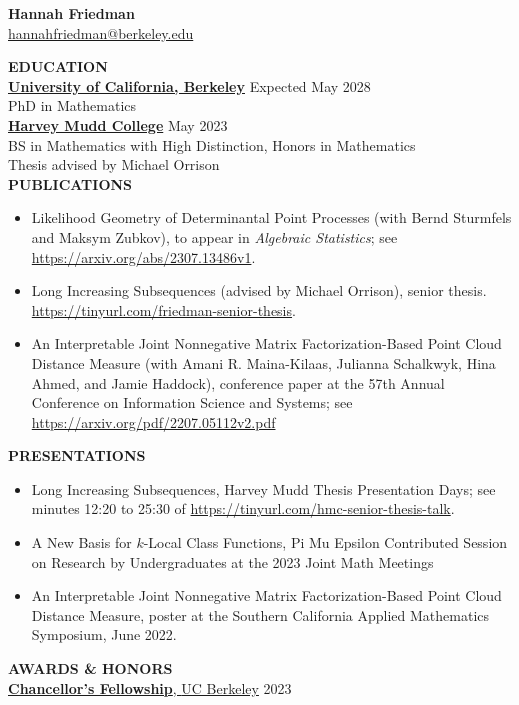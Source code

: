 \documentclass[11pt]{article}
\newcommand{\hdr}[1]{\textcolor{blue(ryb)}{\textbf{#1}}}
\newcommand{\role}[3]{\underline{\textbf{#1}, {#2}} \hfill #3}
\begin{document}
\begin{center}
\hdr{\Large{Hannah Friedman}}\\
\url{hannahfriedman@berkeley.edu}\\
\end{center}
\medskip
\raggedright
\hdr{EDUCATION}\\
\textbf{\underline{University of California, Berkeley}} \hfill Expected May 2028\\
PhD in Mathematics\\
\textbf{\underline{Harvey Mudd College}} \hfill May 2023\\
BS in Mathematics with High Distinction, Honors in Mathematics\\
Thesis advised by Michael Orrison\\
\bigskip
\hdr{PUBLICATIONS}\\
\begin{itemize}
\item Likelihood Geometry of Determinantal Point Processes (with Bernd Sturmfels and Maksym Zubkov), to appear in \emph{Algebraic Statistics}; see  \url{https://arxiv.org/abs/2307.13486v1}.
\item Long Increasing Subsequences (advised by Michael Orrison), senior thesis.  \url{https://tinyurl.com/friedman-senior-thesis}.
\item An Interpretable Joint Nonnegative Matrix Factorization-Based Point Cloud Distance Measure (with Amani R. Maina-Kilaas, Julianna Schalkwyk, Hina Ahmed, and Jamie Haddock), conference paper at the 57th Annual Conference on Information Science and Systems; see \url{https://arxiv.org/pdf/2207.05112v2.pdf}
\end{itemize}
\hdr{PRESENTATIONS}\\
\begin{itemize}
\item Long Increasing Subsequences, Harvey Mudd Thesis Presentation Days; see minutes 12:20 to 25:30 of \url{https://tinyurl.com/hmc-senior-thesis-talk}.
\item A New Basis for $k$-Local Class Functions, Pi Mu Epsilon Contributed Session on Research by Undergraduates at the 2023 Joint Math Meetings
\item An Interpretable Joint Nonnegative Matrix Factorization-Based Point Cloud Distance Measure, poster at the Southern California Applied Mathematics Symposium, June 2022.
\end{itemize}
\medskip
\hdr{AWARDS \& HONORS}\\
\role{Chancellor's Fellowship}{UC Berkeley}{2023}\\
\end{document}
